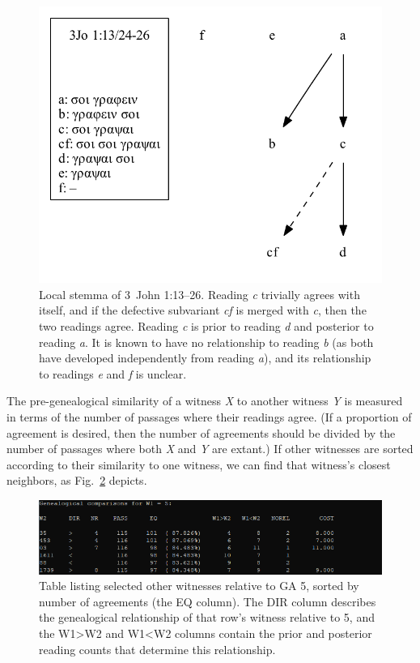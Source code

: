 \documentclass[a4paper, 12pt]{article}
\begin{document}
	\begin{figure}[h!]
		\centering
		\includegraphics[scale=0.6666]{../graphics/B25K1V13U24-26-local-stemma.pdf}
		\caption{Local stemma of 3~John 1:13–26. Reading \emph{c} trivially agrees with itself, and if the defective subvariant \emph{cf} is merged with \emph{c}, then the two readings agree. Reading \emph{c} is prior to reading \emph{d} and posterior to reading \emph{a}. It is known to have no relationship to reading \emph{b} (as both have developed independently from reading \emph{a}), and its relationship to readings \emph{e} and \emph{f} is unclear.}
		\label{fig:genealogical-relationships}
	\end{figure}
	
	\newpage
	
	The pre-genealogical similarity of a witness \emph{X} to another witness \emph{Y} is measured in terms of the number of passages where their readings agree. (If a proportion of agreement is desired, then the number of agreements should be divided by the number of passages where both \emph{X} and \emph{Y} are extant.) If other witnesses are sorted according to their similarity to one witness, we can find that witness's closest neighbors, as Fig.~\ref{fig:compare-witnesses} depicts.
	
	\begin{figure}[h!]
		\centering
		\includegraphics[width=\textwidth]{../graphics/compare-witnesses.png}
		\caption{Table listing selected other witnesses relative to GA 5, sorted by number of agreements (the \textsf{EQ} column). The \textsf{DIR} column describes the genealogical relationship of that row's witness relative to 5, and the \textsf{W1>W2} and \textsf{W1<W2} columns contain the prior and posterior reading counts that determine this relationship.}
		\label{fig:compare-witnesses}
	\end{figure}
	
\end{document}
